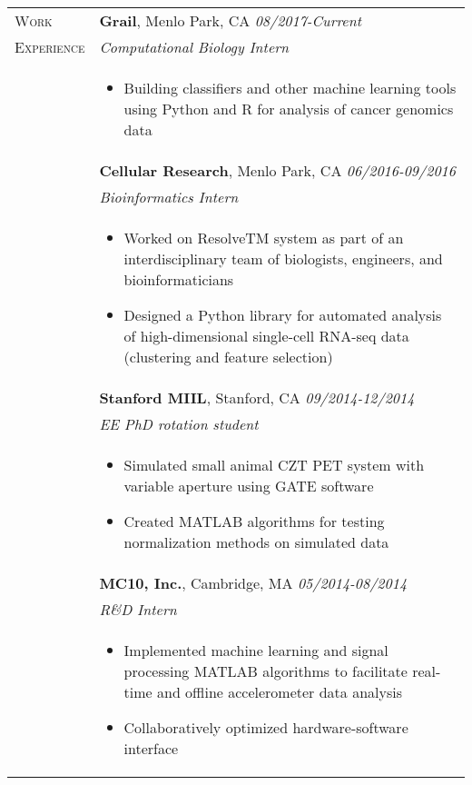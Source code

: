 \documentclass[letterpaper,11pt,oneside]{article}
\begin{document}
\begin{longtable}{@{} p{2.5cm} p{14.8cm}}
     
  \large{\textsc{Work}}  & \textbf{Grail}, Menlo Park, CA \hfill \textit{08/2017-Current} \\*
  \large{\textsc{Experience}}  & \textit{Computational Biology Intern} \\* 
& 
\vspace{-7mm}
\begin{itemize}[leftmargin=.5cm]
	\setlength\itemsep{-0.3em}
	\item Building classifiers and other machine learning tools using Python and R for analysis of cancer genomics data
\end{itemize} 
\\

& \textbf{Cellular Research}, Menlo Park, CA \hfill \textit{06/2016-09/2016} \\*
& \textit{Bioinformatics Intern} \\* 
& 
\vspace{-7mm}
\begin{itemize}[leftmargin=.5cm]
	\setlength\itemsep{-0.3em}
	\item Worked on ResolveTM system as part of an interdisciplinary team of biologists, engineers, and bioinformaticians
	\item Designed a Python library for automated analysis of high-dimensional single-cell RNA-seq data (clustering and feature selection)
\end{itemize} 
\\

& \textbf{Stanford MIIL}, Stanford, CA \hfill \textit{09/2014-12/2014} \\
& \textit{EE PhD rotation student} \\ 
& 
\vspace{-7mm}
\begin{itemize}[leftmargin=.5cm]
	\setlength\itemsep{-0.3em}
	\item Simulated small animal CZT PET system with variable aperture using GATE software
	\item Created MATLAB algorithms for testing normalization methods on simulated data
\end{itemize} 
\\

& \textbf{MC10, Inc.}, Cambridge, MA \hfill \textit{05/2014-08/2014} \\
& \textit{R\&D Intern} \\ 
& 
\vspace{-7mm}
\begin{itemize}[leftmargin=.5cm]
	\setlength\itemsep{-0.3em}
	\item Implemented machine learning and signal processing MATLAB algorithms to facilitate real-time and offline accelerometer data analysis
	\item Collaboratively optimized hardware-software interface
\end{itemize} 
\\


\end{longtable}
\end{document}
